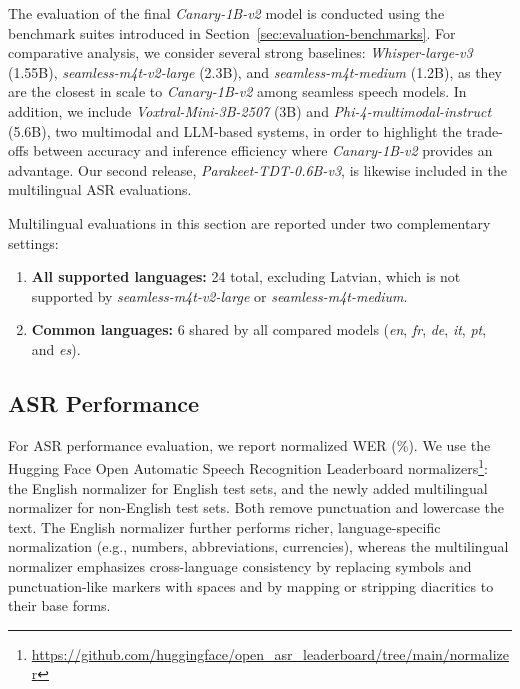 \label{sec:eval}

The evaluation of the final \emph{Canary-1B-v2} model is conducted using the benchmark suites introduced in Section~\ref{sec:evaluation-benchmarks}. For comparative analysis, we consider several strong baselines: \emph{Whisper-large-v3} (1.55B), \emph{seamless-m4t-v2-large} (2.3B), and \emph{seamless-m4t-medium} (1.2B), as they are the closest in scale to \emph{Canary-1B-v2} among seamless speech models. In addition, we include \emph{Voxtral-Mini-3B-2507}\cite{liu2025voxtral} (3B) and \emph{Phi-4-multimodal-instruct}\cite{abouelenin2025phi4multimodal} (5.6B), two multimodal and LLM-based systems, in order to highlight the trade-offs between accuracy and inference efficiency where \emph{Canary-1B-v2} provides an advantage. Our second release, \emph{Parakeet-TDT-0.6B-v3}, is likewise included in the multilingual ASR evaluations.



Multilingual evaluations in this section are reported under two complementary settings:  
\begin{enumerate}
    \item \textbf{All supported languages:} 24 total, excluding Latvian, which is not supported by \emph{seamless-m4t-v2-large} or \emph{seamless-m4t-medium}.  
    \item \textbf{Common languages:} 6 shared by all compared models (\emph{en}, \emph{fr}, \emph{de}, \emph{it}, \emph{pt}, and \emph{es}).  
\end{enumerate}


\subsection{ASR Performance}

For ASR performance evaluation, we report normalized WER (\%). We use the Hugging Face Open Automatic Speech Recognition Leaderboard normalizers\footnote{\url{https://github.com/huggingface/open_asr_leaderboard/tree/main/normalizer}}: the English normalizer for English test sets, and the newly added multilingual normalizer for non-English test sets. Both remove punctuation and lowercase the text. The English normalizer further performs richer, language-specific normalization (e.g., numbers, abbreviations, currencies), whereas the multilingual normalizer emphasizes cross-language consistency by replacing symbols and punctuation-like markers with spaces and by mapping or stripping diacritics to their base forms.



